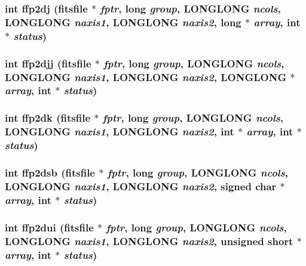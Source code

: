 \subsubsection{\setlength{\rightskip}{0pt plus 5cm}int ffp2dj (\bf{fitsfile} $\ast$ {\em fptr}, long {\em group}, \bf{LONGLONG} {\em ncols}, \bf{LONGLONG} {\em naxis1}, \bf{LONGLONG} {\em naxis2}, long $\ast$ {\em array}, int $\ast$ {\em status})}\label{src_2fitsio_8h_bedbc492a2862dcbe85415d0f5963a92}


\subsubsection{\setlength{\rightskip}{0pt plus 5cm}int ffp2djj (\bf{fitsfile} $\ast$ {\em fptr}, long {\em group}, \bf{LONGLONG} {\em ncols}, \bf{LONGLONG} {\em naxis1}, \bf{LONGLONG} {\em naxis2}, \bf{LONGLONG} $\ast$ {\em array}, int $\ast$ {\em status})}\label{src_2fitsio_8h_e377ad35a13d57c75f0f3e0f27be7e39}


\subsubsection{\setlength{\rightskip}{0pt plus 5cm}int ffp2dk (\bf{fitsfile} $\ast$ {\em fptr}, long {\em group}, \bf{LONGLONG} {\em ncols}, \bf{LONGLONG} {\em naxis1}, \bf{LONGLONG} {\em naxis2}, int $\ast$ {\em array}, int $\ast$ {\em status})}\label{src_2fitsio_8h_5cd35b8cecc698e509678e88cff3c92c}


\subsubsection{\setlength{\rightskip}{0pt plus 5cm}int ffp2dsb (\bf{fitsfile} $\ast$ {\em fptr}, long {\em group}, \bf{LONGLONG} {\em ncols}, \bf{LONGLONG} {\em naxis1}, \bf{LONGLONG} {\em naxis2}, signed char $\ast$ {\em array}, int $\ast$ {\em status})}\label{src_2fitsio_8h_e6a70017924d08f130af5f122d7b610e}


\subsubsection{\setlength{\rightskip}{0pt plus 5cm}int ffp2dui (\bf{fitsfile} $\ast$ {\em fptr}, long {\em group}, \bf{LONGLONG} {\em ncols}, \bf{LONGLONG} {\em naxis1}, \bf{LONGLONG} {\em naxis2}, unsigned short $\ast$ {\em array}, int $\ast$ {\em status})}\label{src_2fitsio_8h_35a8533785911cfd707b4ec578f431b0}


